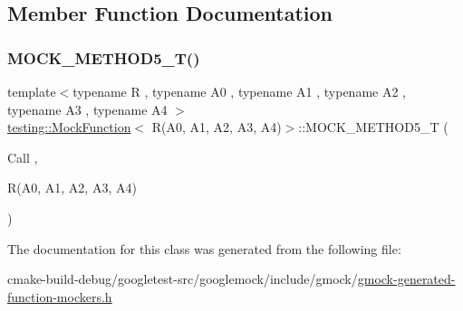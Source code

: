 \subsection{Member Function Documentation}
\mbox{\label{classtesting_1_1MockFunction_3_01R_07A0_00_01A1_00_01A2_00_01A3_00_01A4_08_4_a572318905fea75f71338c120f7d1833d}} 
\subsubsection{\texorpdfstring{MOCK\_METHOD5\_T()}{MOCK\_METHOD5\_T()}}
{\footnotesize\ttfamily template$<$typename R , typename A0 , typename A1 , typename A2 , typename A3 , typename A4 $>$ \\
\mbox{\hyperlink{classtesting_1_1MockFunction}{testing\+::\+Mock\+Function}}$<$ R(A0, A1, A2, A3, A4)$>$\+::M\+O\+C\+K\+\_\+\+M\+E\+T\+H\+O\+D5\+\_\+T (\begin{DoxyParamCaption}\item[{Call}]{,  }\item[{R(A0, A1, A2, A3, A4)}]{ }\end{DoxyParamCaption})}



The documentation for this class was generated from the following file\+:\begin{DoxyCompactItemize}
\item 
cmake-\/build-\/debug/googletest-\/src/googlemock/include/gmock/\mbox{\hyperlink{gmock-generated-function-mockers_8h}{gmock-\/generated-\/function-\/mockers.\+h}}\end{DoxyCompactItemize}
